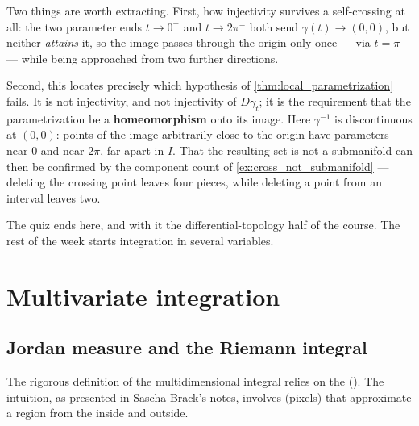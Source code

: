 \begin{ainote}
Two things are worth extracting. First, how injectivity survives a self-crossing at all: the two
parameter ends $t \to 0^+$ and $t \to 2\pi^-$ both send $\gamma(t) \to (0,0)$, but neither
\emph{attains} it, so the image passes through the origin only once --- via $t = \pi$ --- while
being approached from two further directions.

Second, this locates precisely which hypothesis of \cref{thm:local_parametrization} fails. It is
not injectivity, and not injectivity of $D\gamma_t$; it is the requirement that the
parametrization be a \textbf{homeomorphism} onto its image. Here $\gamma^{-1}$ is discontinuous
at $(0,0)$: points of the image arbitrarily close to the origin have parameters near $0$ and near
$2\pi$, far apart in $I$. That the resulting set is not a submanifold can then be confirmed by
the component count of \cref{ex:cross_not_submanifold} --- deleting the crossing point leaves
four pieces, while deleting a point from an interval leaves two.
\end{ainote}

The quiz ends here, and with it the differential-topology half of the course. The rest of the
week starts integration in several variables.

\section{Multivariate integration}
\label{sec:multivariate_integration}

\subsection{Jordan measure and the Riemann integral}
The rigorous definition of the multidimensional integral relies on the  (). The intuition, as presented in Sascha Brack's notes, involves  (pixels) that approximate a region from the inside and outside.

